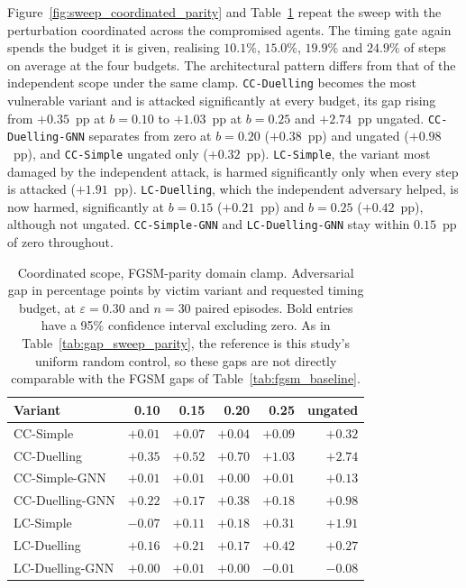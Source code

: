 Figure~\ref{fig:sweep_coordinated_parity} and
Table~\ref{tab:gap_sweep_coordinated_parity} repeat the sweep with the perturbation
coordinated across the compromised agents. The timing gate again spends the budget it
is given, realising $10.1\%$, $15.0\%$, $19.9\%$ and $24.9\%$ of steps on average at the
four budgets. The architectural pattern differs from that of the independent scope
under the same clamp. \texttt{CC-Duelling} becomes the most vulnerable variant and is
attacked significantly at every budget, its gap rising from $+0.35$~pp at $b = 0.10$ to
$+1.03$~pp at $b = 0.25$ and $+2.74$~pp ungated. \texttt{CC-Duelling-GNN} separates
from zero at $b = 0.20$ ($+0.38$~pp) and ungated ($+0.98$~pp), and \texttt{CC-Simple}
ungated only ($+0.32$~pp). \texttt{LC-Simple}, the variant most damaged by the
independent attack, is harmed significantly only when every step is attacked
($+1.91$~pp). \texttt{LC-Duelling}, which the independent adversary helped, is now
harmed, significantly at $b = 0.15$ ($+0.21$~pp) and $b = 0.25$ ($+0.42$~pp), although
not ungated. \texttt{CC-Simple-GNN} and \texttt{LC-Duelling-GNN} stay within $0.15$~pp
of zero throughout.

\begin{table}[htbp]
  \centering
  \caption[Coordinated scope, FGSM-parity clamp: adversarial gap by timing budget]{%
           Coordinated scope, FGSM-parity domain clamp. Adversarial gap in percentage
           points by victim variant and requested timing budget, at
           $\varepsilon = 0.30$ and $n = 30$ paired episodes. Bold entries have a 95\%
           confidence interval excluding zero. As in
           Table~\ref{tab:gap_sweep_parity}, the reference is this study's uniform
           random control, so these gaps are not directly comparable with the FGSM gaps
           of Table~\ref{tab:fgsm_baseline}.}
  \label{tab:gap_sweep_coordinated_parity}
  \begin{tabular}{lrrrrr}
    \hline
    \textbf{Variant} & \textbf{0.10} & \textbf{0.15} & \textbf{0.20} & \textbf{0.25} & \textbf{ungated} \\
    \hline
    CC-Simple        & $+0.01$ & $+0.07$ & $+0.04$ & $+0.09$ & $\mathbf{+0.32}$ \\
    CC-Duelling      & $\mathbf{+0.35}$ & $\mathbf{+0.52}$ & $\mathbf{+0.70}$ & $\mathbf{+1.03}$ & $\mathbf{+2.74}$ \\
    CC-Simple-GNN    & $+0.01$ & $+0.01$ & $+0.00$ & $+0.01$ & $+0.13$ \\
    CC-Duelling-GNN  & $+0.22$ & $+0.17$ & $\mathbf{+0.38}$ & $+0.18$ & $\mathbf{+0.98}$ \\
    LC-Simple        & $-0.07$ & $+0.11$ & $+0.18$ & $+0.31$ & $\mathbf{+1.91}$ \\
    LC-Duelling      & $+0.16$ & $\mathbf{+0.21}$ & $+0.17$ & $\mathbf{+0.42}$ & $+0.27$ \\
    LC-Duelling-GNN  & $+0.00$ & $+0.01$ & $+0.00$ & $-0.01$ & $-0.08$ \\
    \hline
  \end{tabular}
\end{table}

